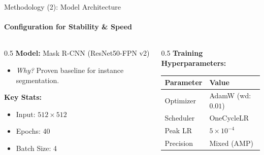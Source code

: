 \documentclass{beamer}
\begin{document}
\begin{frame}{Methodology (2): Model Architecture}
    \framesubtitle{Configuration for Stability \& Speed}

    \begin{columns}
        \begin{column}{0.5\textwidth}
            \textbf{Model:} Mask R-CNN (ResNet50-FPN v2)
            \begin{itemize}
                \item \textit{Why?} Proven baseline for instance segmentation.
            \end{itemize}
            \vspace{0.5cm}
            \textbf{Key Stats:}
            \begin{itemize}
                \item Input: $512 \times 512$
                \item Epochs: 40
                \item Batch Size: 4
            \end{itemize}
        \end{column}
        \begin{column}{0.5\textwidth}
            \textbf{Training Hyperparameters:}
            \begin{table}
                \centering
                \small
                \begin{tabular}{ll}
                    \toprule
                    \textbf{Parameter} & \textbf{Value} \\
                    \midrule
                    Optimizer & AdamW (wd: $0.01$) \\
                    Scheduler & OneCycleLR \\
                    Peak LR & $5 \times 10^{-4}$ \\
                    Precision & Mixed (AMP) \\
                    \bottomrule
                \end{tabular}
            \end{table}
        \end{column}
    \end{columns}
\end{frame}
\end{document}
